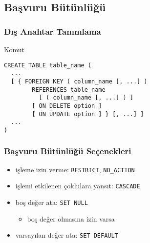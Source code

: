 \documentclass[dvipsnames]{beamer}
\theoremstyle{definition}
\theoremstyle{example}
\theoremstyle{plain}
\begin{document}
\subsection{Başvuru Bütünlüğü}

\begin{frame}[fragile]
  \frametitle{Dış Anahtar Tanımlama}

  \begin{block}{Komut}
    \begin{lstlisting}
CREATE TABLE table_name (
  ...
  [ { FOREIGN KEY ( column_name [, ...] )
        REFERENCES table_name
          [ ( column_name [, ...] ) ]
        [ ON DELETE option ]
        [ ON UPDATE option ] } [, ...] ]
  ...
)
    \end{lstlisting}
  \end{block}
\end{frame}

\begin{frame}
  \frametitle{Başvuru Bütünlüğü Seçenekleri}

  \begin{itemize}
    \item işleme izin verme: \texttt{RESTRICT}, \texttt{NO\_ACTION}

    \pause
    \item işlemi etkilenen çoklulara yansıt: \texttt{CASCADE}

    \pause
    \item boş değer ata: \texttt{SET NULL}
    \begin{itemize}
      \item boş değer olmasına izin varsa
    \end{itemize}

    \pause
    \item varsayılan değer ata: \texttt{SET DEFAULT}
  \end{itemize}
\end{frame}
\end{document}
